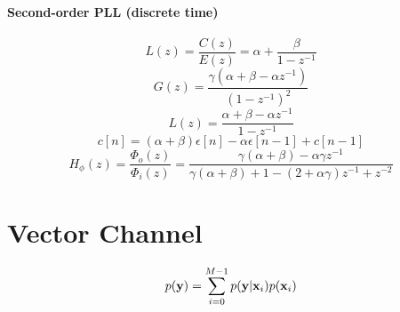 \paragraph{Second-order PLL (discrete time)}
\begin{equation}
L(z) = \frac{C(z)}{E(z)} = \alpha + \frac{\beta}{1-z^{-1}}
\label{eq:pllLzSecondOrder}
\end{equation}
\begin{equation}
G(z) = \frac{\gamma (\alpha + \beta - \alpha z^{-1})}{(1-z^{-1})^2}
\label{eq:pllOpenLoop2order}
\end{equation}
\begin{equation}
L(z) = \frac{\alpha + \beta - \alpha z^{-1}}{1-z^{-1}}
\label{eq:pllLzSecondOrder2}
\end{equation}
\begin{equation}
c[n] = (\alpha+\beta)\epsilon[n]  - \alpha \epsilon[n-1] + c[n-1]
\label{eq:pllDifferenceEq2}
\end{equation}
\begin{equation}
H_{\phi}(z) = \frac{\Phi_o(z)}{\Phi_i(z)} = \frac{\gamma(\alpha+\beta) - \alpha \gamma z^{-1}}{\gamma(\alpha+\beta)+1 - (2+\alpha \gamma) z^{-1} + z^{-2}}
\label{eq:pllTransferFunctionDiscreteTimeComplete}
\end{equation}

\section*{Vector Channel}
\[
p({\textbf y}) = \sum_{i=0}^{M-1} p({\textbf y}|{\textbf x}_i) p({\textbf x}_i)
\]

